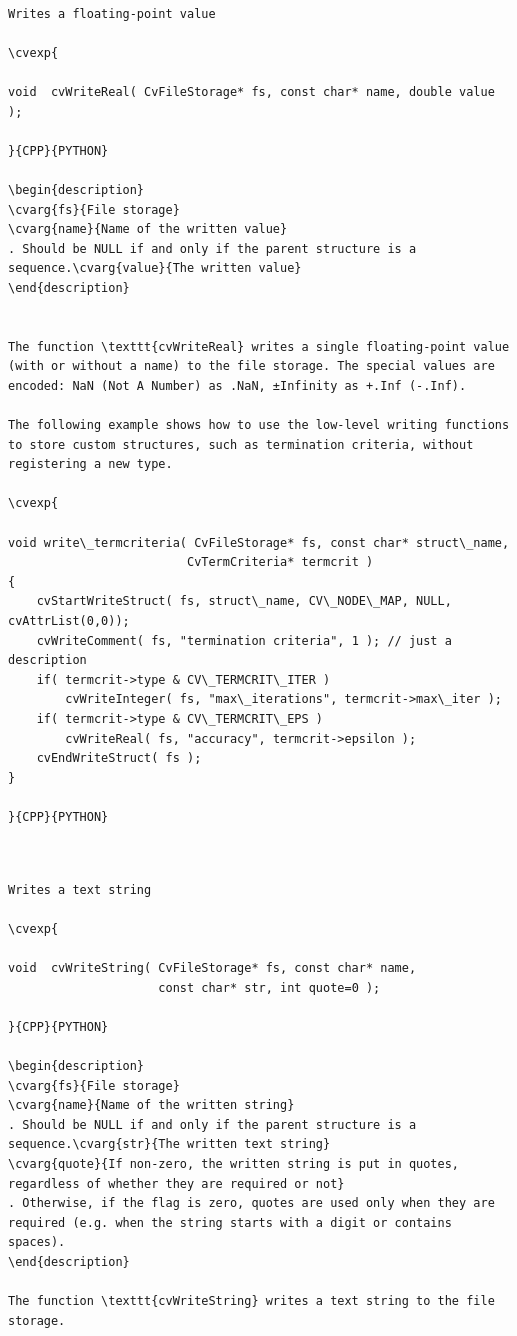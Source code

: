 \begin{verbatim}

Writes a floating-point value

\cvexp{

void  cvWriteReal( CvFileStorage* fs, const char* name, double value );

}{CPP}{PYTHON}

\begin{description}
\cvarg{fs}{File storage}
\cvarg{name}{Name of the written value}
. Should be NULL if and only if the parent structure is a sequence.\cvarg{value}{The written value}
\end{description}


The function \texttt{cvWriteReal} writes a single floating-point value (with or without a name) to the file storage. The special values are encoded: NaN (Not A Number) as .NaN, ±Infinity as +.Inf (-.Inf).

The following example shows how to use the low-level writing functions to store custom structures, such as termination criteria, without registering a new type.

\cvexp{

void write\_termcriteria( CvFileStorage* fs, const char* struct\_name,
                         CvTermCriteria* termcrit )
{
    cvStartWriteStruct( fs, struct\_name, CV\_NODE\_MAP, NULL, cvAttrList(0,0));
    cvWriteComment( fs, "termination criteria", 1 ); // just a description
    if( termcrit->type & CV\_TERMCRIT\_ITER )
        cvWriteInteger( fs, "max\_iterations", termcrit->max\_iter );
    if( termcrit->type & CV\_TERMCRIT\_EPS )
        cvWriteReal( fs, "accuracy", termcrit->epsilon );
    cvEndWriteStruct( fs );
}

}{CPP}{PYTHON}


\end{verbatim}
\label{WriteString}
\begin{verbatim}

Writes a text string

\cvexp{

void  cvWriteString( CvFileStorage* fs, const char* name,
                     const char* str, int quote=0 );

}{CPP}{PYTHON}

\begin{description}
\cvarg{fs}{File storage}
\cvarg{name}{Name of the written string}
. Should be NULL if and only if the parent structure is a sequence.\cvarg{str}{The written text string}
\cvarg{quote}{If non-zero, the written string is put in quotes, regardless of whether they are required or not}
. Otherwise, if the flag is zero, quotes are used only when they are required (e.g. when the string starts with a digit or contains spaces).
\end{description}

The function \texttt{cvWriteString} writes a text string to the file storage.


\end{verbatim}
